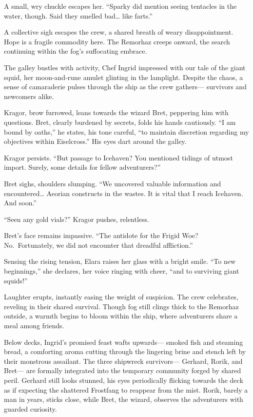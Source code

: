 \documentclass[
  letterpaper,12pt,twoside,twocolumn,openany,
  nodeprecatedcode,bg=full]{dndbook}
\begin{document}
A small, wry chuckle escapes her. ``Sparky did mention seeing tentacles
in the water, though. Said they smelled bad\ldots{} like farts.''

A collective sigh escapes the crew, a shared breath of weary
disappointment. Hope is a fragile commodity here. The Remorhaz creeps
onward, the search continuing within the fog's suffocating embrace.

The galley bustles with activity, Chef Ingrid impressed with our tale of
the giant squid, her moon-and-rune amulet glinting in the lamplight.
Despite the chaos, a sense of camaraderie pulses through the ship as the
crew gathers--- survivors and newcomers alike.

Kragor, brow furrowed, leans towards the wizard Bret, peppering him with
questions. Bret, clearly burdened by secrets, folds his hands
cautiously. ``I am bound by oaths,'' he states, his tone careful, ``to
maintain discretion regarding my objectives within Eiselcross.'' His
eyes dart around the galley.

Kragor persists. ``But passage to Icehaven? You mentioned tidings of
utmost import. Surely, some details for fellow adventurers?''

Bret sighs, shoulders slumping. ``We uncovered valuable information and
encountered\ldots{} Aeorian constructs in the wastes. It is vital that I
reach Icehaven. And soon.''

``Seen any gold vials?'' Kragor pushes, relentless.

Bret's face remains impassive. ``The antidote for the Frigid Woe?
No.~Fortunately, we did not encounter that dreadful affliction.''

Sensing the rising tension, Elara raises her glass with a bright smile.
``To new beginnings,'' she declares, her voice ringing with cheer, ``and
to surviving giant squids!''

Laughter erupts, instantly easing the weight of suspicion. The crew
celebrates, reveling in their shared survival. Though fog still clings
thick to the Remorhaz outside, a warmth begins to bloom within the ship,
where adventurers share a meal among friends.

Below decks, Ingrid's promised feast wafts upwards--- smoked fish and
steaming bread, a comforting aroma cutting through the lingering brine
and stench left by their monstrous assailant. The three shipwreck
survivors--- Gerhard, Rorik, and Bret--- are formally integrated into
the temporary community forged by shared peril. Gerhard still looks
stunned, his eyes periodically flicking towards the deck as if expecting
the shattered Frostfang to reappear from the mist. Rorik, barely a man
in years, sticks close, while Bret, the wizard, observes the adventurers
with guarded curiosity.
\end{document}
